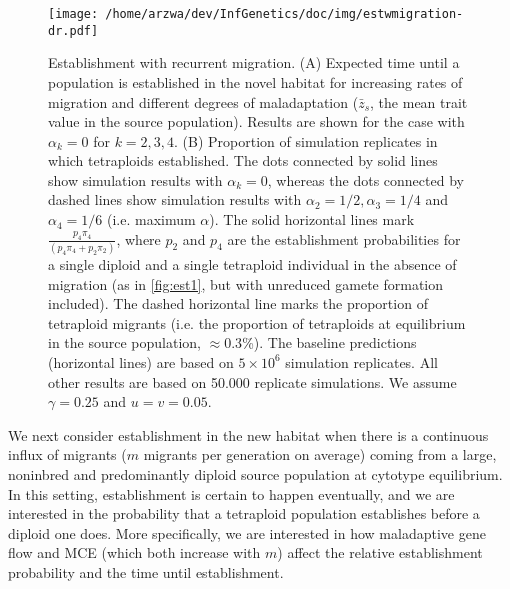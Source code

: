 \documentclass[12pt,a4paper]{article}
\begin{document}
\begin{figure}[t]
\centering
\texttt{[image: /home/arzwa/dev/InfGenetics/doc/img/estwmigration-dr.pdf]}
\caption{
    Establishment with recurrent migration.
    (A) Expected time until a population is established in the novel habitat
    for increasing rates of migration and different degrees of maladaptation
    ($\bar{z}_s$, the mean trait value in the source population). Results are
    shown for the case with $\alpha_k = 0$ for $k=2,3,4$. 
    (B) Proportion of simulation replicates in which tetraploids established.
    The dots connected by solid lines show simulation results with
    $\alpha_k=0$, whereas the dots connected by dashed lines
    show simulation results with $\alpha_2=1/2, \alpha_3=1/4$ and
    $\alpha_4=1/6$ (i.e. maximum $\alpha$).
    The solid horizontal lines mark $\frac{p_4\pi_4}{(p_4\pi_4 + p_2\pi_2)}$,
    where $p_2$ and $p_4$ are the establishment probabilities for a single
    diploid and a single tetraploid individual in the absence of migration (as
    in \cref{fig:est1}, but with unreduced gamete formation included). 
    The dashed horizontal line marks the proportion of tetraploid migrants
    (i.e. the proportion of tetraploids at equilibrium in the source
    population, $\approx 0.3$\%).
    The baseline predictions (horizontal lines) are based on $5\times 10^6$
    simulation replicates.
    All other results are based on 50.000 replicate simulations.
    We assume $\gamma=0.25$ and $u=v=0.05$.
    \label{fig:estwmig}}
\end{figure}

We next consider establishment in the new habitat when there is a continuous
influx of migrants ($m$ migrants per generation on average) coming from a large,
noninbred and predominantly diploid source population at cytotype equilibrium.
In this setting, establishment is certain to happen eventually, and we are
interested in the probability that a tetraploid population establishes before a
diploid one does.
More specifically, we are interested in how maladaptive gene flow and MCE
(which both increase with $m$) affect the relative establishment probability
and the time until establishment.
\end{document}
